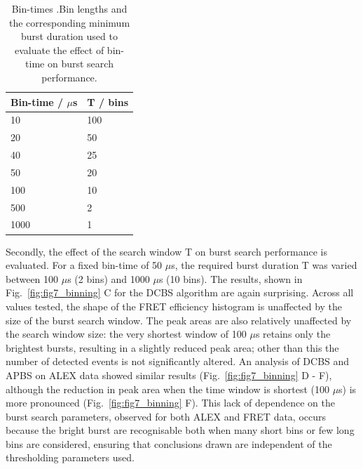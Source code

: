 \begin{table}[!ht]
\caption{Bin-times .Bin lengths and the corresponding minimum burst duration used to evaluate the effect of bin-time on burst search performance.}
\begin{tabular}{|l|l|}
\hline
Bin-time / $\mu$s & T / bins \\
\hline
10 & 100 \\
20 & 50 \\
40 & 25 \\
50 & 20 \\
100 & 10 \\
500 & 2 \\
1000 & 1\\
\hline
\end{tabular}

\label{tab:bin-times}
\end{table}

Secondly, the effect of the search window T on burst search performance is evaluated. For a fixed bin-time of 50 $\mu$s,  the required burst duration T was varied between 100 $\mu$s (2 bins) and 1000 $\mu$s (10 bins). The results, shown in Fig.~\ref{fig:fig7_binning} C for the DCBS algorithm are again surprising. Across all values tested, the shape of the FRET efficiency histogram is unaffected by the size of the burst search window. The peak areas are also relatively unaffected by the search window size: the very shortest window of 100 $\mu$s retains only the brightest bursts, resulting in a slightly reduced peak area; other than this the number of detected events is not significantly altered. An analysis of DCBS and APBS on ALEX data showed similar results (Fig.~\ref{fig:fig7_binning} D - F), although the reduction in peak area when the time window is shortest (100 $\mu$s) is more pronounced (Fig.~\ref{fig:fig7_binning} F). This lack of dependence on the burst search parameters, observed for both ALEX and FRET data, occurs because the bright burst are recognisable both when many short bins or few long bins are considered, ensuring that conclusions drawn are independent of the thresholding parameters used.

